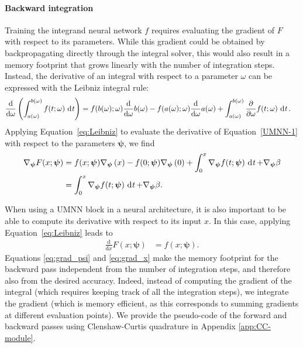\paragraph{Backward integration}
Training the integrand neural network $f$ requires evaluating the gradient of $F$ with respect to its parameters. While this gradient could be obtained by backpropagating directly through the integral solver, this would also result in a memory footprint that grows linearly with the number of integration steps. Instead, the derivative of an integral with respect to a parameter $\omega$ can be expressed with the Leibniz integral rule:
\begin{align}
    \frac{\mathrm{d}}{\mathrm{d} \omega}\left({\int^{b(\omega)}_{a(\omega)}f(t; \omega) \operatorname{\, \mathrm{d}\mathit{t}}}\right) &= f(b(\omega); \omega) \frac{\mathrm{d}}{\mathrm{d} \omega}b(\omega) - f(a(\omega);\omega) \frac{\mathrm{d}}{\mathrm{d}\omega}a(\omega) + \int^{b(\omega)}_{a(\omega)} \frac{\partial}{\partial \omega}f(t; \omega) \operatorname{\, \mathrm{d}\mathit{t}}. \label{eq:Leibniz}
\end{align}
Applying Equation~\eqref{eq:Leibniz} to evaluate the derivative of Equation~\eqref{UMNN-1} with respect to the parameters $\mathbf{\psi}$, we find
\begin{align}
    \nabla_{\mathbf{\psi}} F(x; \mathbf{\psi}) &= f(x; \mathbf{\psi}) \nabla_{\mathbf{\psi}}\brac{x} - f(0; \mathbf{\psi}) \nabla_{\mathbf{\psi}}\brac{0} + \int^x_0 \nabla_{\mathbf{\psi}} f(t; \mathbf{\psi}) \dt + \nabla_{\mathbf{\psi}}\beta\nonumber \\
    &= \int^x_0 \nabla_{\mathbf{\psi}} f(t; \mathbf{\psi}) \dt + \nabla_{\mathbf{\psi}}\beta. \label{eq:grad_psi}
\end{align}

When using a UMNN block in a neural architecture, it is also important to be able to compute its derivative with respect to its input $x$. In this case, applying Equation~\eqref{eq:Leibniz} leads to
\begin{align}
    \frac{\mathrm{d}}{\mathrm{d}x}F(x; \mathbf{\psi}) &= f(x; \mathbf{\psi}).\label{eq:grad_x}
\end{align}
Equations \eqref{eq:grad_psi} and \eqref{eq:grad_x} make the memory footprint for the backward pass independent from the number of integration steps, and therefore also from the desired accuracy. Indeed, instead of computing the gradient of the integral (which requires keeping track of all the integration steps), we integrate the gradient (which is memory efficient, as this corresponds to summing gradients at different evaluation points). We provide the pseudo-code of the forward and backward passes using Clenshaw-Curtis quadrature in Appendix \ref{app:CC-module}.

